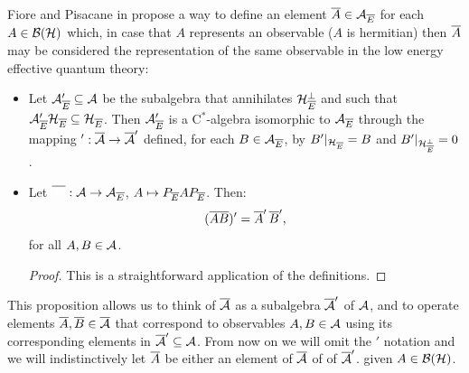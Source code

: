 Fiore and Pisacane in \cite{Fiore2018} propose a way to define an element $\overline{A} \in \mathcal A_{\overline{E}}$ for each $A \in \mathcal B(\mathcal H)$ which, in case that $A$ represents an observable ($A$ is hermitian) then $\overline{A}$ may be considered the representation of the same observable in the low energy effective quantum theory:
\begin{proposition}
        \hfill
        \begin{itemize}
            
            \item Let $\mathcal A_{\overline{E}}' \subseteq \mathcal A$ be the subalgebra that annihilates $\mathcal H_{\overline{E}}^\perp$ and such that $\mathcal A_{\overline{E}}' \mathcal H_{\overline{E}} \subseteq \mathcal H_{\overline{E}}$. Then $\mathcal A_{\overline{E}}'$ is a C$^*$-algebra isomorphic to $\mathcal A_{\overline{E}}$ through the mapping $': \overline{\mathcal A} \to \overline{\mathcal A}'$ defined, for each $B \in \mathcal A_{\overline{E}}$, by $B'|_{\mathcal H_{\overline{E}}} = B$ and $B'|_{\mathcal H_{\overline{E}}^\perp} = 0$.
            
            \item Let $\overline{\color{white}M}: \acal \to \acal_{\cut E}$, $A \mapsto P_{\overline{E}} A P_{\overline{E}}$. Then:
            \begin{equation}
                (\overline{A} \overline{B})' = \overline{A}'\, \overline{B}',
            \end{equation}
            for all $A, B \in \mathcal A$.
        \begin{proof}
        This is a straightforward application of the definitions.
        \end{proof}
        \end{itemize}
        \end{proposition}
        \begin{notation}
        This proposition allows us to think of $\overline{\mathcal A}$ as a subalgebra $\overline{\mathcal A}'$ of $\mathcal A$, and to operate elements $\overline{A}, \overline{B} \in \overline{\mathcal A}$ that correspond to observables $A, B \in \mathcal A$ using its corresponding elements in $\overline{\mathcal A}' \subseteq \mathcal A$. From now on we will omit the $'$ notation and we will indistinctively let $\overline{A}$ be either an element of $\overline{\mathcal A}$ of of $\overline{\mathcal A}'$. given $A \in \mathcal B(\mathcal H)$.
        \end{notation}
         
        

